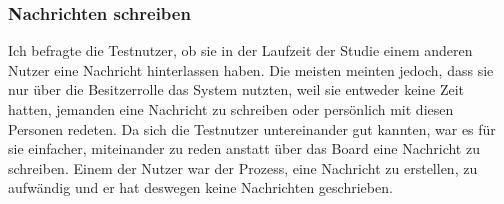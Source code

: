 




\subsubsection{Nachrichten schreiben}\label{Nachrichten schreiben}
Ich befragte die Testnutzer, ob sie in der Laufzeit der Studie einem anderen Nutzer eine Nachricht hinterlassen haben.
Die meisten meinten jedoch, dass sie nur über die Besitzerrolle das System nutzten, weil sie entweder keine Zeit hatten, jemanden eine Nachricht zu schreiben oder persönlich mit diesen Personen redeten.
Da sich die Testnutzer untereinander gut kannten, war es für sie einfacher, miteinander zu reden anstatt über das Board eine Nachricht zu schreiben.
Einem der Nutzer war der Prozess, eine Nachricht zu erstellen, zu aufwändig und er hat deswegen keine Nachrichten geschrieben.
